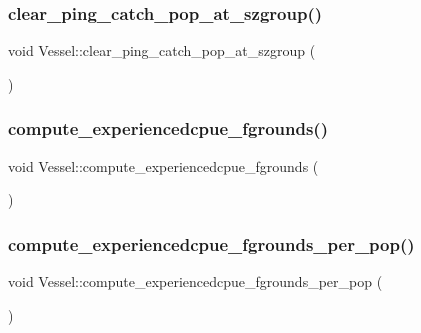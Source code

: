 \subsubsection{\texorpdfstring{clear\_ping\_catch\_pop\_at\_szgroup()}{clear\_ping\_catch\_pop\_at\_szgroup()}}
{\footnotesize\ttfamily void Vessel\+::clear\+\_\+ping\+\_\+catch\+\_\+pop\+\_\+at\+\_\+szgroup (\begin{DoxyParamCaption}{ }\end{DoxyParamCaption})}

\mbox{\label{class_vessel_aa3564ac86c4965a228be81ed2a2b92bf}} 
\subsubsection{\texorpdfstring{compute\_experiencedcpue\_fgrounds()}{compute\_experiencedcpue\_fgrounds()}}
{\footnotesize\ttfamily void Vessel\+::compute\+\_\+experiencedcpue\+\_\+fgrounds (\begin{DoxyParamCaption}{ }\end{DoxyParamCaption})}

\mbox{\label{class_vessel_a4c299fe9205eb1e95c9fc966051e0acc}} 
\subsubsection{\texorpdfstring{compute\_experiencedcpue\_fgrounds\_per\_pop()}{compute\_experiencedcpue\_fgrounds\_per\_pop()}}
{\footnotesize\ttfamily void Vessel\+::compute\+\_\+experiencedcpue\+\_\+fgrounds\+\_\+per\+\_\+pop (\begin{DoxyParamCaption}{ }\end{DoxyParamCaption})}

\mbox{\label{class_vessel_a7134c14aa3c1d2fd09e4adca4b9b851b}} 
